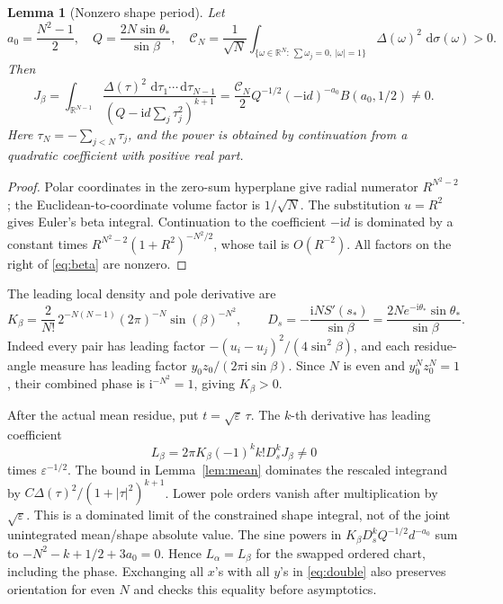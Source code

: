 \documentclass[11pt]{article}
\numberwithin{equation}{section}
\newtheorem{lemma}[theorem]{Lemma}
\theoremstyle{definition}
\newcommand{\dd}{\,\mathrm d}
\newcommand{\ii}{\mathrm i}
\newcommand{\R}{\mathbb R}
\newcommand{\eps}{\varepsilon}
\newcommand{\sstar}{s_*}
\begin{document}
\begin{lemma}[Nonzero shape period]\label{lem:period}
Let
\[
 a_0=\frac{N^2-1}{2},\quad Q=\frac{2N\sin\theta_*}{\sin\beta},\quad
 \mathscr C_N=\frac1{\sqrt N}
 \int_{\{\omega\in\R^N:\,\sum\omega_j=0,\ |\omega|=1\}}
       \Delta(\omega)^2\,\dd\sigma(\omega)>0 .
\]
Then
\begin{equation}
 J_\beta=\int_{\R^{N-1}}\frac{\Delta(\tau)^2\,
                  \dd\tau_1\cdots\dd\tau_{N-1}}
                   {(Q-\ii d\sum_j\tau_j^2)^{k+1}}
 =\frac{\mathscr C_N}{2}Q^{-1/2}(-\ii d)^{-a_0}
                     B(a_0,1/2)\ne0. \label{eq:beta}
\end{equation}
Here \(\tau_N=-\sum_{j<N}\tau_j\), and the power is obtained by
continuation from a quadratic coefficient with positive real part.
\end{lemma}
\begin{proof}
Polar coordinates in the zero-sum hyperplane give radial numerator
\(R^{N^2-2}\); the Euclidean-to-coordinate volume factor is \(1/\sqrt N\).
The substitution \(u=R^2\) gives Euler's beta integral.
Continuation to the coefficient \(-\ii d\) is dominated by a constant
times \(R^{N^2-2}(1+R^2)^{-N^2/2}\), whose tail is \(O(R^{-2})\).
All factors on the right of \eqref{eq:beta} are nonzero.
\end{proof}

The leading local density and pole derivative are
\[
 K_\beta=\frac2{N!}\,2^{-N(N-1)}(2\pi)^{-N}\sin(\beta)^{-N^2},
 \qquad
 D_s=-\frac{\ii N S'(\sstar)}{\sin\beta}
     =\frac{2N e^{-\ii\theta_*}\sin\theta_*}{\sin\beta}.
\]
Indeed every pair has leading factor
\(- (u_i-u_j)^2/(4\sin^2\beta)\), and each residue-angle measure
has leading factor \(y_0z_0/(2\pi\ii\sin\beta)\).
Since \(N\) is even and \(y_0^Nz_0^N=1\), their combined phase is
\(\ii^{-N^2}=1\), giving \(K_\beta>0\).

After the actual mean residue, put \(t=\sqrt\eps\,\tau\).
The \(k\)-th derivative has leading coefficient
\[
 L_\beta=2\pi K_\beta(-1)^k k!D_s^kJ_\beta\ne0
\]
times \(\eps^{-1/2}\). The bound in Lemma~\ref{lem:mean} dominates
the rescaled integrand by
\(C\Delta(\tau)^2/(1+|\tau|^2)^{k+1}\).
Lower pole orders vanish after multiplication by \(\sqrt\eps\).
This is a dominated limit of the constrained shape integral,
not of the joint unintegrated mean/shape absolute value.
The sine powers in \(K_\beta D_s^kQ^{-1/2}d^{-a_0}\) sum to
\(-N^2-k+1/2+3a_0=0\). Hence \(L_\alpha=L_\beta\)
for the swapped ordered chart, including the phase. Exchanging all
\(x\)'s with all \(y\)'s in \eqref{eq:double} also preserves orientation
for even \(N\) and checks this equality before asymptotics.
\end{document}
